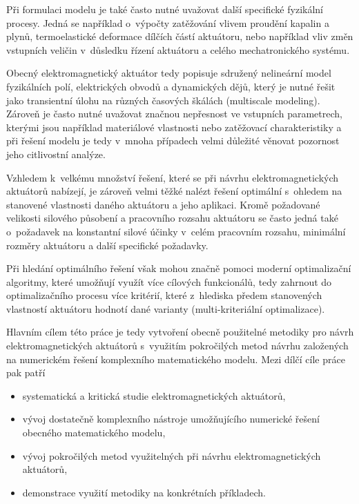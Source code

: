 Při formulaci modelu je také často nutné uvažovat další specifické fyzikální procesy. Jedná se například o~výpočty zatěžování vlivem proudění kapalin a plynů, termoelastické deformace dílčích částí aktuátoru, nebo například vliv změn vstupních veličin v~důsledku řízení aktuátoru a celého mechatronického systému.

Obecný elektromagnetický aktuátor tedy popisuje sdružený nelineární model fyzikálních polí, elektrických obvodů a dynamických dějů, který je nutné řešit jako transientní úlohu na různých časových škálách (multiscale modeling). Zároveň je často nutné uvažovat značnou nepřesnost ve vstupních parametrech, kterými jsou například materiálové vlastnosti nebo zatěžovací charakteristiky a při řešení modelu je tedy v~mnoha případech velmi důležité věnovat pozornost jeho citlivostní analýze.

Vzhledem k~velkému množství řešení, které se při návrhu elektromagnetických aktuátorů nabízejí, je zároveň velmi těžké nalézt řešení optimální s~ohledem na stanovené vlastnosti daného aktuátoru a jeho aplikaci. Kromě požadované velikosti silového působení a pracovního rozsahu aktuátoru se často jedná také o~požadavek na konstantní silové účinky v~celém pracovním rozsahu, minimální rozměry aktuátoru a další specifické požadavky.

Při hledání optimálního řešení však mohou značně pomoci moderní optimalizační algoritmy, které umožňují využít více cílových funkcionálů, tedy zahrnout do optimalizačního procesu více kritérií, které z~hlediska předem stanovených vlastností aktuátoru hodnotí dané varianty (multi-kriteriální optimalizace).

Hlavním cílem této práce je tedy vytvoření obecně použitelné metodiky pro návrh elektromagnetických aktuátorů s~využitím pokročilých metod návrhu založených na numerickém řešení komplexního matematického modelu. Mezi dílčí cíle práce pak patří
\begin{itemize}
    \item systematická a kritická studie elektromagnetických aktuátorů,
    \item vývoj dostatečně komplexního nástroje umožňujícího numerické řešení obecného matematického modelu,
    \item vývoj pokročilých metod využitelných při návrhu elektromagnetických aktuátorů,
    \item demonstrace využití metodiky na konkrétních příkladech.
\end{itemize}